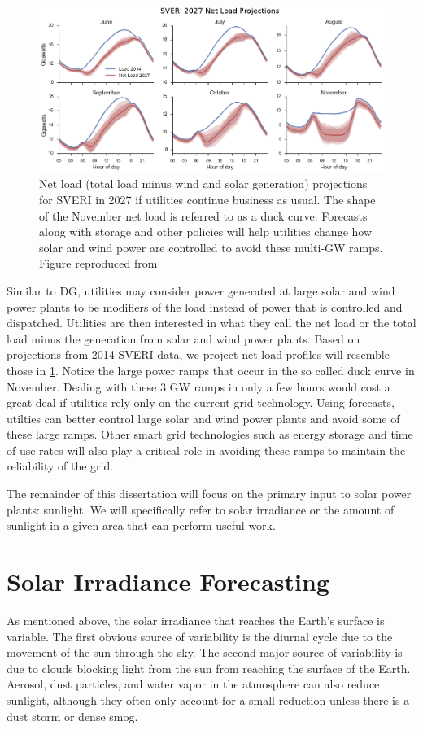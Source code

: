 \begin{figure}[h]
\centering
\includegraphics[width=\textwidth]{figs/duckcurves.png}
\caption[Projected SVERI 2027 duck curves]{Net load (total load minus
  wind and solar generation) projections for SVERI in 2027 if
  utilities continue business as usual. The shape of the November net
  load is referred to as a duck curve. Forecasts along with storage
  and other policies will help utilities change how solar and wind
  power are controlled to avoid these multi-GW ramps. Figure
  reproduced from \cite{sveri_report}}
\label{fig:duckcurves}
\end{figure}

Similar to DG, utilities may consider power generated at large solar
and wind power plants to be modifiers of the load instead of power
that is controlled and dispatched.
Utilities are then interested in what they call the net load or the
total load minus the generation from solar and wind power plants.
Based on projections from 2014 SVERI data, we project net load
profiles will resemble those in \cref{fig:duckcurves}.
Notice the large power ramps that occur in the so called duck curve in
November.
Dealing with these 3 GW ramps in only a few hours would cost a great
deal if utilities rely only on the current grid technology.
Using forecasts, utilties can better control large solar and wind
power plants and avoid some of these large ramps.
Other smart grid technologies such as energy storage and time of use
rates will also play a critical role in avoiding these ramps to
maintain the reliability of the grid.

The remainder of this dissertation will focus on the primary input to
solar power plants: sunlight.
We will specifically refer to solar irradiance or the amount of
sunlight in a given area that can perform useful work.

\section{Solar Irradiance Forecasting}
As mentioned above, the solar irradiance that reaches the Earth's
surface is variable.
The first obvious source of variability is the diurnal cycle due to
the movement of the sun through the sky.
The second major source of variability is due to clouds blocking light
from the sun from reaching the surface of the Earth.
Aerosol, dust particles, and water vapor in the atmosphere can also
reduce sunlight, although they often only account for a small
reduction unless there is a dust storm or dense smog.

